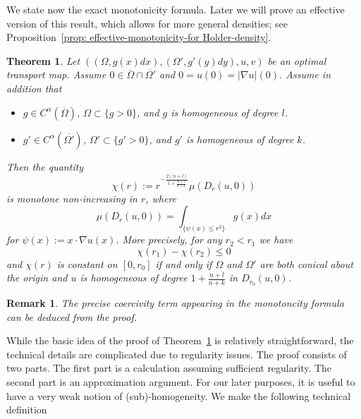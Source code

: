 \documentclass[12pt,reqno]{amsart}
\newtheorem{remark}{Remark}[section]
\newtheorem{theorem}{Theorem}[section]
\numberwithin{equation}{section}
\begin{document}
We state now the exact monotonicity formula.  Later we will prove an effective version of this result, which allows for more general densities; see Proposition~\ref{prop: effective-monotonicity-for Holder-density}.

\begin{theorem}\label{thm: monotonicity}
    Let $((\Omega, g(x)dx), (\Omega', g'(y)dy), u, v)$ be an optimal transport map. Assume $0\in \overline\Omega\cap\overline{\Omega'}$ and $0 = u(0)= |\nabla u|(0)$. Assume in addition that
    \begin{itemize}
        \item[$(i)$]$g\in C^{\alpha}(\overline{\Omega})$, $\Omega \subset \{g>0\}$, and $g$ is homogeneous of degree $l$.
        \item[(ii)]$g'\in C^{\alpha}(\overline{\Omega'})$, $\Omega' \subset \{g'>0\}$, and $g'$ is homogeneous of degree $k$.
    \end{itemize}
    Then the quantity
	\[\chi(r) := r^{-\frac{2(n+l)}{1+\frac{n+l}{n+k}}}\mu(D_r(u, 0)) \]
    is monotone non-increasing in $r$, where \[\mu(D_r(u, 0)) = \int_{\{\psi(x)\leq r^2\}}g(x)dx\]
    for $\psi(x):= x\cdot \nabla u(x)$. 
    More precisely, for any $r_2<r_1$ we have
    \[
    \chi(r_1)-\chi(r_2) \leq  0
    \]
    and $\chi(r)$ is constant on $[0,r_0]$ if and only if $\Omega$ and $\Omega'$ are both conical about the origin and $u$ is homogeneous of degree $1+\frac{n+l}{n+k}$ in $D_{r_0}(u, 0)$. 
\end{theorem}

\begin{remark}
    The precise coercivity term appearing in the monotoncity formula can be deduced from the proof.
\end{remark}

While the basic idea of the proof of Theorem~\ref{thm: monotonicity} is relatively straightforward, the technical details are complicated due to regularity issues.  The proof consists of two parts.  The first part is a calculation assuming sufficient regularity.  The second part is an approximation argument. For our later purposes, it is useful to have a very weak notion of (sub)-homogeneity.  We make the following technical definition
\end{document}
